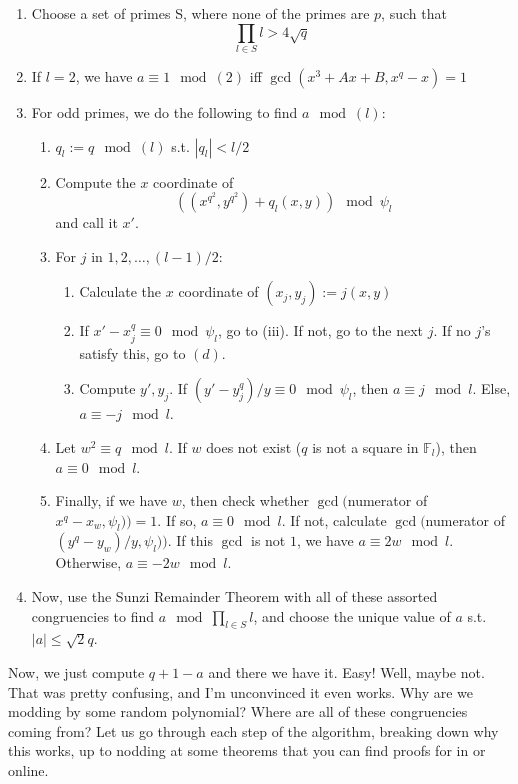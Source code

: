 \documentclass[11pt,reqno]{amsart}
\theoremstyle{definition}
\begin{document}
\begin{enumerate}
\item Choose a set of primes S, where none of the primes are $p$, such that $$\prod_{l \in S}l > 4\sqrt{q}$$

\item If $l=2$, we have $a\equiv1 \mod(2)$ iff $\gcd(x^3 + Ax + B, x^q-x) = 1$ 

\item For odd primes, we do the following to find $a \mod (l)$:
\begin{enumerate}
\item $q_l := q \mod (l)$ s.t. $|q_l|<l/2$

\item Compute the $x$ coordinate of $$((x^{q^2}, y^{q^2}) + q_l(x, y)) \mod \psi_l$$
and call it $x'$.
\item For $j$ in ${1, 2, \dots, (l-1)/2}$:
\begin{enumerate}

\item Calculate the $x$ coordinate of $(x_j, y_j):=j(x, y)$
\item If $x'-x_j^q \equiv 0 \mod\psi_l$, go to (iii). If not, go to the next $j$. If no $j$'s satisfy this, go to $(d)$.
\item Compute $y', y_j$. If $(y'-y_j^q)/y \equiv 0 \mod \psi_l$, then $a\equiv j \mod l$. Else, $a \equiv -j \mod l$.
\end{enumerate}

\item Let $w^2 \equiv q \mod l$. If $w$ does not exist ($q$ is not a square in $\mathbb{F}_l$), then $a\equiv 0 \mod l$. 

\item Finally, if we have $w$, then check whether $\gcd($numerator of $ x^q-x_w, \psi_l)) = 1$. If so, $a \equiv 0 \mod l$. If not, calculate $\gcd($numerator of $(y^q-y_w)/y, \psi_l))$. If this $\gcd$ is not $1$, we have $a \equiv 2w \mod l$. Otherwise, $a \equiv -2w \mod l$. 

\end{enumerate}

\item Now, use the Sunzi Remainder Theorem with all of these assorted congruencies to find $a \mod \prod_{l \in S} l$, and choose the unique value of $a$ s.t. $|a| \leq \sqrt{2}q$.  

\end{enumerate}

Now, we just compute $q+1-a$ and there we have it. Easy! Well, maybe not. That was pretty confusing, and I'm unconvinced it even works. Why are we modding by some random polynomial? Where are all of these congruencies coming from? Let us go through each step of the algorithm, breaking down why this works, up to nodding at some theorems that you can find proofs for in \cite{Washington} or online. 
\end{document}
